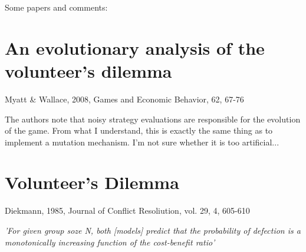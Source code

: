 \documentclass{article}
\begin{document}
Some papers and comments:

\section{An evolutionary analysis of the volunteer's dilemma}

Myatt \& Wallace, 2008, Games and Economic Behavior, 62, 67-76

The authors note that noisy strategy evaluations are responsible for the evolution of the game. From what I understand, this is exactly the same thing as to implement a mutation mechanism. I'm not sure whether it is too artificial...

\section{Volunteer's Dilemma}

Diekmann, 1985, Journal of Conflict Resoliution, vol. 29, 4, 605-610

\emph{'For given group soze N, both [models] predict that the probability of defection is a monotonically increasing function of the cost-benefit ratio'}
\end{document}
